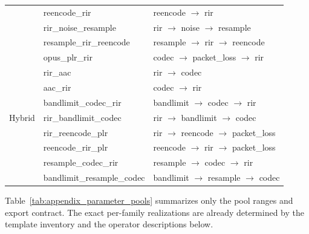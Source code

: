 \begin{table}[t]
\begin{tabular}{@{}p{}p{}p{}@{}}
& reencode\_rir & reencode $\rightarrow$ rir \\
& rir\_noise\_resample & rir $\rightarrow$ noise $\rightarrow$ resample \\
& resample\_rir\_reencode & resample $\rightarrow$ rir $\rightarrow$ reencode \\
\midrule
\multirow[t]{9}{*}{Hybrid} & opus\_plr\_rir & codec $\rightarrow$ packet\_loss $\rightarrow$ rir \\
& rir\_aac & rir $\rightarrow$ codec \\
& aac\_rir & codec $\rightarrow$ rir \\
& bandlimit\_codec\_rir & bandlimit $\rightarrow$ codec $\rightarrow$ rir \\
& rir\_bandlimit\_codec & rir $\rightarrow$ bandlimit $\rightarrow$ codec \\
& rir\_reencode\_plr & rir $\rightarrow$ reencode $\rightarrow$ packet\_loss \\
& reencode\_rir\_plr & reencode $\rightarrow$ rir $\rightarrow$ packet\_loss \\
& resample\_codec\_rir & resample $\rightarrow$ codec $\rightarrow$ rir \\
& bandlimit\_resample\_codec & bandlimit $\rightarrow$ resample $\rightarrow$ codec \\
\bottomrule
\end{tabular}
\end{table}

Table~\ref{tab:appendix_parameter_pools} summarizes only the pool ranges and export contract. The exact per-family realizations are already determined by the template inventory and the operator descriptions below.

